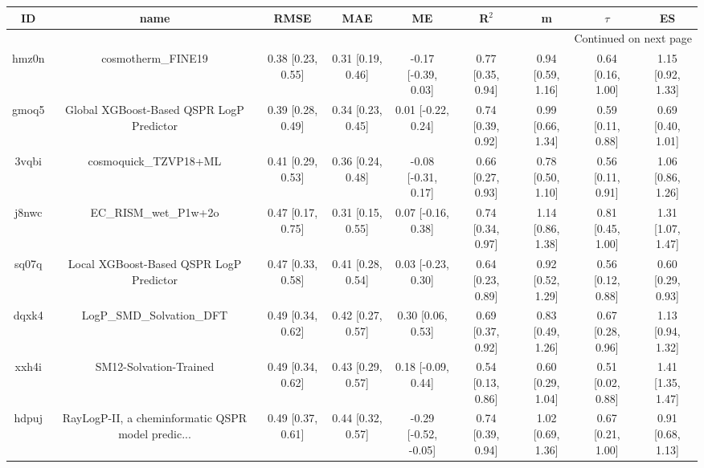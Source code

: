 \documentclass{article}
\begin{document}
\begin{center}
\scriptsize
\begin{longtable}{|ccccccccc|}
\toprule
    ID &                                               name &               RMSE &                MAE &                    ME &              R$^2$ &                    m &               $\tau$ &                    ES \\
\midrule
\endhead
\midrule
\multicolumn{9}{r}{{Continued on next page}} \\
\midrule
\endfoot

\bottomrule
\endlastfoot
 hmz0n &                                 cosmotherm\_FINE19 &  0.38 [0.23, 0.55] &  0.31 [0.19, 0.46] &   -0.17 [-0.39, 0.03] &  0.77 [0.35, 0.94] &    0.94 [0.59, 1.16] &    0.64 [0.16, 1.00] &     1.15 [0.92, 1.33] \\
 gmoq5 &           Global XGBoost-Based QSPR LogP Predictor &  0.39 [0.28, 0.49] &  0.34 [0.23, 0.45] &    0.01 [-0.22, 0.24] &  0.74 [0.39, 0.92] &    0.99 [0.66, 1.34] &    0.59 [0.11, 0.88] &     0.69 [0.40, 1.01] \\
 3vqbi &                              cosmoquick\_TZVP18+ML &  0.41 [0.29, 0.53] &  0.36 [0.24, 0.48] &   -0.08 [-0.31, 0.17] &  0.66 [0.27, 0.93] &    0.78 [0.50, 1.10] &    0.56 [0.11, 0.91] &     1.06 [0.86, 1.26] \\
 j8nwc &                              EC\_RISM\_wet\_P1w+2o &  0.47 [0.17, 0.75] &  0.31 [0.15, 0.55] &    0.07 [-0.16, 0.38] &  0.74 [0.34, 0.97] &    1.14 [0.86, 1.38] &    0.81 [0.45, 1.00] &     1.31 [1.07, 1.47] \\
 sq07q &            Local XGBoost-Based QSPR LogP Predictor &  0.47 [0.33, 0.58] &  0.41 [0.28, 0.54] &    0.03 [-0.23, 0.30] &  0.64 [0.23, 0.89] &    0.92 [0.52, 1.29] &    0.56 [0.12, 0.88] &     0.60 [0.29, 0.93] \\
 dqxk4 &                          LogP\_SMD\_Solvation\_DFT &  0.49 [0.34, 0.62] &  0.42 [0.27, 0.57] &     0.30 [0.06, 0.53] &  0.69 [0.37, 0.92] &    0.83 [0.49, 1.26] &    0.67 [0.28, 0.96] &     1.13 [0.94, 1.32] \\
 xxh4i &                             SM12-Solvation-Trained &  0.49 [0.34, 0.62] &  0.43 [0.29, 0.57] &    0.18 [-0.09, 0.44] &  0.54 [0.13, 0.86] &    0.60 [0.29, 1.04] &    0.51 [0.02, 0.88] &     1.41 [1.35, 1.47] \\
 hdpuj &  RayLogP-II, a cheminformatic QSPR model predic... &  0.49 [0.37, 0.61] &  0.44 [0.32, 0.57] &  -0.29 [-0.52, -0.05] &  0.74 [0.39, 0.94] &    1.02 [0.69, 1.36] &    0.67 [0.21, 1.00] &     0.91 [0.68, 1.13] \\

\end{longtable}
\end{center}
\end{document}
